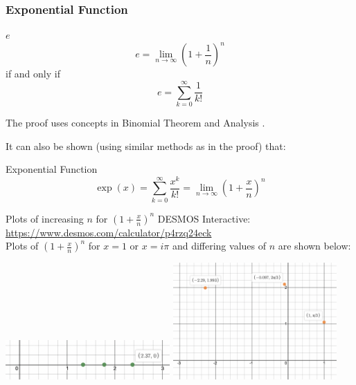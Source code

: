\documentclass{beamer}
\begin{document}
\begin{frame}
  \frametitle{Exponential Function}
  \begin{block}{$e$}
    \[ e = \lim_{n\rightarrow \infty}\left(1 + \frac{1}{n}\right)^n \]
    if and only if
    \[ e = \sum_{k=0}^\infty \frac{1}{k!}\]
  \end{block}
  The proof uses concepts in Binomial Theorem and Analysis \parencite[pp.~64-65]{rudin}.

  It can also be shown (using similar methods as in the proof) that:
  \begin{block}{Exponential Function \parencite[p.~174]{rudin}}
    \[\exp(x) = \sum_{k=0}^\infty \frac{x^k}{k!} = \lim_{n\rightarrow\infty}\left(1 + \frac{x}{n}\right)^n \]
  \end{block}
\end{frame}

\begin{frame}
  \begin{block}{Plots of increasing $n$ for $(1 + \frac{x}{n})^n$}
  DESMOS Interactive: \url{https://www.desmos.com/calculator/p4rzq24eck}\\
  Plots of $(1+\frac{x}{n})^n$ for $x = 1$ or $x=i\pi$ and differing values of $n$ are shown below:
  \end{block}
  \begin{minipage}{\textwidth}
    \includegraphics[width=0.47\textwidth]{real_exp_3.png}
    \includegraphics[width=0.47\textwidth]{complex_exp_3.png}
  \end{minipage}
\end{frame}
\end{document}
